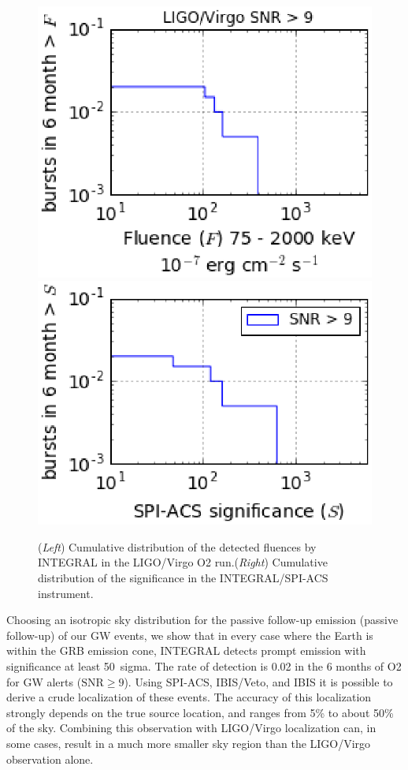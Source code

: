 \documentclass[11pt]{article}
\begin{document}
\begin{figure}
	\centering
    \includegraphics[scale=.6]{P7-1_f1.eps}
    \includegraphics[scale=.6]{P7-1_f2.eps}
    \caption{(\textit{Left}) Cumulative distribution of the
      detected fluences by INTEGRAL in the LIGO/Virgo O2
      run.(\textit{Right}) Cumulative distribution of the significance
      in the INTEGRAL/SPI-ACS instrument.}
    \label{fluence_significance}
\end{figure}

Choosing an isotropic sky distribution for the passive follow-up
emission (passive follow-up) of our GW events, we show that in every
case where the Earth is within the GRB emission cone, INTEGRAL detects
prompt emission with significance at least 50~sigma.  The rate of
detection is 0.02 in the 6 months of O2 for GW alerts ($\mathrm{SNR}
\geq 9$). Using SPI-ACS, IBIS/Veto, and IBIS it is possible to derive a
crude localization of these events. The accuracy of this localization
strongly depends on the true source location, and ranges from 5\% to
about 50\% of the sky. Combining this observation 
with  LIGO/Virgo localization can, in some cases, result in a much more smaller 
sky region than the LIGO/Virgo observation alone.
\end{document}
